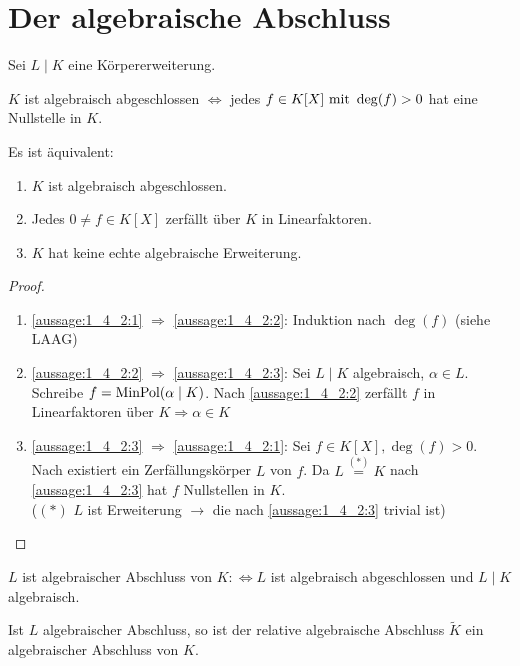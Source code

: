 \section{Der algebraische Abschluss}
Sei $L\mid K$ eine Körpererweiterung.
\begin{definition}
	$K$ ist algebraisch abgeschlossen $\Longleftrightarrow$ jedes $f \in K[X] \mit \deg(f) > 0$ hat eine Nullstelle in $K$.
\end{definition}
\begin{lemma}
	Es ist äquivalent:
	\begin{enumerate}[label=(\alph*)]
		\item $K$ ist algebraisch abgeschlossen. \label{aussage:1_4_2:1}
		\item Jedes $0 \neq f \in K[X]$ zerfällt über $K$ in Linearfaktoren. \label{aussage:1_4_2:2}
		\item $K$ hat keine echte algebraische Erweiterung. \label{aussage:1_4_2:3}
	\end{enumerate}
\end{lemma}
\begin{proof} %
	\begin{enumerate}[label=(\alph*)]
		\item \ref{aussage:1_4_2:1} $\Rightarrow$ \ref{aussage:1_4_2:2}: Induktion nach $\deg(f)$ (siehe LAAG)
		\item \ref{aussage:1_4_2:2} $\Rightarrow$ \ref{aussage:1_4_2:3}: Sei $L \mid K$ algebraisch, $\alpha \in L$. Schreibe $f = \MinPol(\alpha \mid K)$. Nach \ref{aussage:1_4_2:2} zerfällt $f$ in Linearfaktoren über $K \Rightarrow \alpha \in K$
		\item \ref{aussage:1_4_2:3} $\Rightarrow$ \ref{aussage:1_4_2:1}: Sei $f \in K[X], \deg(f) > 0$. Nach  existiert ein Zerfällungskörper $L$ von $f$. Da $L\overset{(*)}{=}K$ nach \ref{aussage:1_4_2:3} hat $f$ Nullstellen in $K$. \\
		($(*)$ $L$ ist Erweiterung $\rightarrow$ die nach \ref{aussage:1_4_2:3} trivial ist)
	\end{enumerate}
\end{proof}
\begin{definition}
	$L$ ist algebraischer Abschluss von $K :\Longleftrightarrow L$ ist algebraisch abgeschlossen und $L\mid K$ algebraisch.
\end{definition}
\begin{lemma}
	Ist $L$ algebraischer Abschluss, so ist der relative algebraische Abschluss $\tilde{K}$ ein algebraischer Abschluss von $K$.
\end{lemma}
